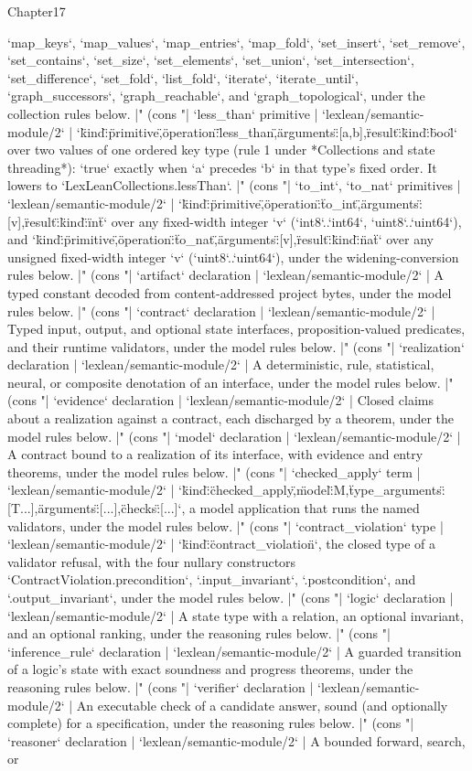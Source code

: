 \begin{lexlean}{Chapter17}
\begin{semanticmodule}
{{`map_keys`, `map_values`, `map_entries`, `map_fold`, `set_insert`, `set_remove`, `set_contains`, `set_size`, `set_elements`, `set_union`, `set_intersection`, `set_difference`, `set_fold`, `list_fold`, `iterate`, `iterate_until`, `graph_successors`, `graph_reachable`, and `graph_topological`, under the collection rules below. |" (cons "| `less_than` primitive | `lexlean/semantic-module/2` | `{\"kind\":\"primitive\",\"operation\":\"less_than\",\"arguments\":[a,b],\"result\":{\"kind\":\"bool\"}}` over two values of one ordered key type (rule 1 under *Collections and state threading*): `true` exactly when `a` precedes `b` in that type's fixed order. It lowers to `LexLeanCollections.lessThan`. |" (cons "| `to_int`, `to_nat` primitives | `lexlean/semantic-module/2` | `{\"kind\":\"primitive\",\"operation\":\"to_int\",\"arguments\":[v],\"result\":{\"kind\":\"int\"}}` over any fixed-width integer `v` (`int8`..`int64`, `uint8`..`uint64`), and `{\"kind\":\"primitive\",\"operation\":\"to_nat\",\"arguments\":[v],\"result\":{\"kind\":\"nat\"}}` over any unsigned fixed-width integer `v` (`uint8`..`uint64`), under the widening-conversion rules below. |" (cons "| `artifact` declaration | `lexlean/semantic-module/2` | A typed constant decoded from content-addressed project bytes, under the model rules below. |" (cons "| `contract` declaration | `lexlean/semantic-module/2` | Typed input, output, and optional state interfaces, proposition-valued predicates, and their runtime validators, under the model rules below. |" (cons "| `realization` declaration | `lexlean/semantic-module/2` | A deterministic, rule, statistical, neural, or composite denotation of an interface, under the model rules below. |" (cons "| `evidence` declaration | `lexlean/semantic-module/2` | Closed claims about a realization against a contract, each discharged by a theorem, under the model rules below. |" (cons "| `model` declaration | `lexlean/semantic-module/2` | A contract bound to a realization of its interface, with evidence and entry theorems, under the model rules below. |" (cons "| `checked_apply` term | `lexlean/semantic-module/2` | `{\"kind\":\"checked_apply\",\"model\":M,\"type_arguments\":[T...],\"arguments\":[...],\"checks\":[...]}`, a model application that runs the named validators, under the model rules below. |" (cons "| `contract_violation` type | `lexlean/semantic-module/2` | `{\"kind\":\"contract_violation\"}`, the closed type of a validator refusal, with the four nullary constructors `ContractViolation.precondition`, `.input_invariant`, `.postcondition`, and `.output_invariant`, under the model rules below. |" (cons "| `logic` declaration | `lexlean/semantic-module/2` | A state type with a relation, an optional invariant, and an optional ranking, under the reasoning rules below. |" (cons "| `inference_rule` declaration | `lexlean/semantic-module/2` | A guarded transition of a logic's state with exact soundness and progress theorems, under the reasoning rules below. |" (cons "| `verifier` declaration | `lexlean/semantic-module/2` | An executable check of a candidate answer, sound (and optionally complete) for a specification, under the reasoning rules below. |" (cons "| `reasoner` declaration | `lexlean/semantic-module/2` | A bounded forward, search, or }}
\end{semanticmodule}
\end{lexlean}
